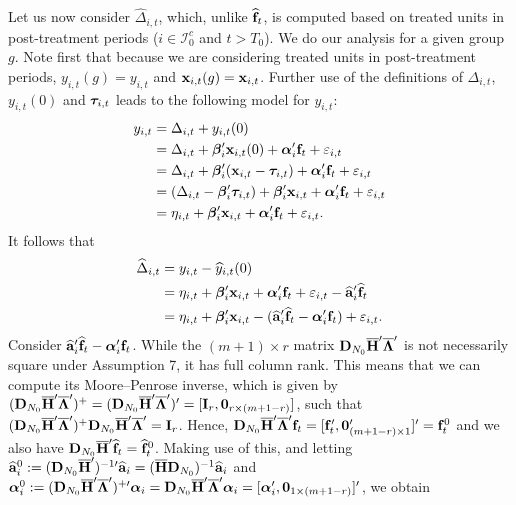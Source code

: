 \documentclass[12pt,fleqn]{article}
\begin{document}
Let us now consider $\widehat \Delta_{i,t}$, which, unlike $\widehat{\mathbf{f}}_t$, is computed based on treated units in post-treatment periods ($i\in \mathcal{I}_0^c$ and $t > T_0$). We do our analysis for a given group $g$. Note first that because we are considering treated units in post-treatment periods, $y_{i,t}(g) = y_{i,t}$ and $\mathbf{x}_{i,t}(g) = \mathbf{x}_{i,t}$. Further use of the definitions of $\Delta_{i,t}$, $y_{i,t}(0)$ and $\boldsymbol{\tau}_{i,t}$ leads to the following model for $y_{i,t}$:
\begin{align}
y_{i,t} &= \Delta_{i,t} + y_{i,t}(0) \notag\\
& = \Delta_{i,t} + \boldsymbol{\beta}_i'\mathbf{x}_{i,t}(0) +  \boldsymbol{\alpha}_i'\mathbf{f}_t + \varepsilon_{i,t}\notag\\
& = \Delta_{i,t} + \boldsymbol{\beta}_i'(\mathbf{x}_{i,t}-\boldsymbol{\tau}_{i,t}) +  \boldsymbol{\alpha}_i'\mathbf{f}_t + \varepsilon_{i,t} \notag\\
& = (\Delta_{i,t} - \boldsymbol{\beta}_i'\boldsymbol{\tau}_{i,t}) + \boldsymbol{\beta}_i'\mathbf{x}_{i,t} + \boldsymbol{\alpha}_i'\mathbf{f}_t + \varepsilon_{i,t} \notag\\
&  = \eta_{i,t} + \boldsymbol{\beta}_i'\mathbf{x}_{i,t} + \boldsymbol{\alpha}_i'\mathbf{f}_t + \varepsilon_{i,t}.
\end{align}
It follows that
\begin{align}
\widehat \Delta_{i,t} & = y_{i,t} - \widehat y_{i,t}(0)  \notag\\
& = \eta_{i,t} + \boldsymbol{\beta}_i'\mathbf{x}_{i,t} + \boldsymbol{\alpha}_i'\mathbf{f}_t + \varepsilon_{i,t} -  \widehat{\mathbf{a}}_i'\widehat{\mathbf{f}}_t   \notag\\
& = \eta_{i,t} + \boldsymbol{\beta}_i'\mathbf{x}_{i,t} - (\widehat{\mathbf{a}}_i'\widehat{\mathbf{f}}_t - \boldsymbol{\alpha}_i'\mathbf{f}_t)  + \varepsilon_{i,t} .
\end{align}
Consider $\widehat{\mathbf{a}}_i'\widehat{\mathbf{f}}_t - \boldsymbol{\alpha}_i'\mathbf{f}_t$. While the $(m+1)\times r$ matrix $\mathbf{D}_{N_0}\overline{\mathbf{H}}'\overline{\boldsymbol{\Lambda}}'$ is not necessarily square under Assumption 7, it has full column rank. This means that we can compute its Moore--Penrose inverse, which is given by $(\mathbf{D}_{N_0}\overline{\mathbf{H}}'\overline{\boldsymbol{\Lambda}}')^+ = (\mathbf{D}_{N_0}\overline{\mathbf{H}}'\overline{\boldsymbol{\Lambda}}')' = [ \mathbf{I}_r, \mathbf{0}_{r\times (m+1-r)} ]$, such that $(\mathbf{D}_{N_0}\overline{\mathbf{H}}'\overline{\boldsymbol{\Lambda}}')^+ \mathbf{D}_{N_0}\overline{\mathbf{H}}'\overline{\boldsymbol{\Lambda}}' = \mathbf{I}_r$. Hence, $\mathbf{D}_{N_0}\overline{\mathbf{H}}'\overline{\boldsymbol{\Lambda}}'\mathbf{f}_t = [\mathbf{f}_t', \mathbf{0}_{(m+1-r)\times 1}']' = \mathbf{f}_t^0$ and we also have $\mathbf{D}_{N_0}\overline{\mathbf{H}}'\widehat{\mathbf{f}}_t=\widehat{\mathbf{f}}^0_t$. Making use of this, and letting $\widehat{\mathbf{a}}_i^0 := (\mathbf{D}_{N_0}\overline{\mathbf{H}}')^{-1\prime}\widehat{\mathbf{a}}_i= (\overline{\mathbf{H}}\mathbf{D}_{N_0})^{-1}\widehat{\mathbf{a}}_i$ and $\boldsymbol{\alpha}_i^0 := (\mathbf{D}_{N_0}\overline{\mathbf{H}}'\overline{\boldsymbol{\Lambda}}')^{+\prime} \boldsymbol{\alpha}_i= \mathbf{D}_{N_0}\overline{\mathbf{H}}'\overline{\boldsymbol{\Lambda}}'\boldsymbol{\alpha}_i = [ \boldsymbol{\alpha}_i ', \mathbf{0}_{1\times (m+1-r)} ]'$, we obtain
\end{document}
